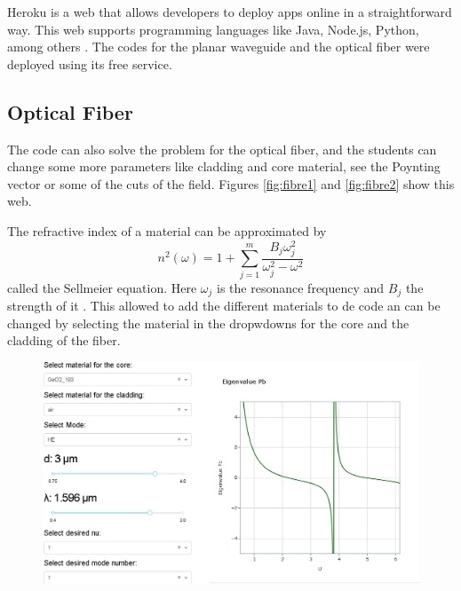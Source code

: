         
        Heroku is a web that allows developers to deploy apps online in a straightforward way. This web supports programming languages like Java, Node.js, Python, among others \cite{heorku}.  The codes for the planar waveguide and the optical fiber were deployed using its free service.

    \subsection{Optical Fiber}
    
        The code can also solve the problem for the optical fiber, and the students can change some more parameters like cladding and core material, see the Poynting vector or some of the cuts of the field. Figures \ref{fig:fibre1} and \ref{fig:fibre2} show this web. 
        
        
        The refractive index of a material can be approximated by 
        \begin{equation}
            n^2 (\omega) = 1 + \sum_{j=1}^{m} \frac{B_j\omega^2_j}{\omega^2_j - \omega^2} 
            \label{eq_ene}
        \end{equation}
        called the Sellmeier equation. Here $\omega_j$ is the resonance frequency and $B_j$ the strength of it \citep{AgrawalBook}. This allowed to add the different materials to de code an can be changed by selecting the material in the dropwdowns for the core and the cladding of the fiber.
        
        
        \begin{figure}[label={fig:fibre1}, caption={\href{https://fiber-mode-app.herokuapp.com/apps/results}{Heroku app} for the optical fiber (1).}]
        	\includegraphics[width=.8\textwidth]{figures/chap2/fibre1.PNG} 
        \end{figure}
        
